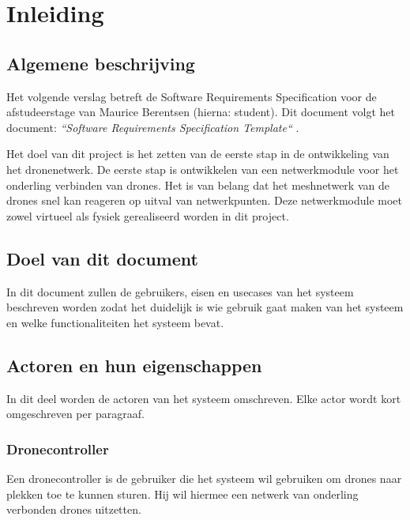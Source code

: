 \documentclass[a4paper, 11pt, oneside]{report}
\begin{document}



\chapter{Inleiding}
\label{inleiding}
\section{Algemene beschrijving}
\label{inleiding:beschrijving}
Het volgende verslag betreft de Software Requirements Specification voor de afstudeerstage van Maurice Berentsen (hierna: student).
Dit document volgt het document: \textit{``Software Requirements Specification Template``} \cite{template:srs}.

Het doel van dit project is het zetten van de eerste stap in de ontwikkeling van het dronenetwerk.
De eerste stap is ontwikkelen van een netwerkmodule voor het onderling verbinden van drones.
Het is van belang dat het meshnetwerk van de drones snel kan reageren op uitval van netwerkpunten.
Deze netwerkmodule moet zowel virtueel als fysiek gerealiseerd worden in dit project.
 

\section{Doel van dit document}
\label{inleiding:doelvanditdoucment}

In dit document zullen de gebruikers, eisen en usecases van het systeem beschreven worden zodat het duidelijk is wie gebruik gaat maken van het systeem en welke functionaliteiten het systeem bevat.   

\section{Actoren en hun eigenschappen}
\label{inleiding:gebruikers}
In dit deel worden de actoren van het systeem omschreven. 
Elke actor wordt kort omgeschreven per paragraaf.

\subsection{Dronecontroller}
\label{inleiding:gebruikers:dronecontroller}
Een dronecontroller is de gebruiker die het systeem wil gebruiken om drones naar plekken toe te kunnen sturen.
Hij wil hiermee een netwerk van onderling verbonden drones uitzetten.  
\end{document}
